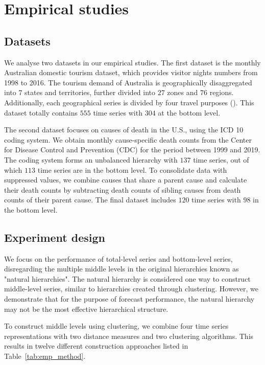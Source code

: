 \documentclass[a4paper,review,12pt,authoryear]{elsarticle}
\begin{document}
\section{Empirical studies}

\subsection{Datasets}

We analyse two datasets in our empirical studies. The first dataset is the monthly Australian domestic tourism dataset, which provides visitor nights numbers from 1998 to 2016. The tourism demand of Australia is geographically disaggregated into $7$ states and territories, further divided into $27$ zones and $76$ regions. Additionally, each geographical series is divided by four travel purposes (\citealp{wickramasuriyaOptimalForecastReconciliation2019}). This dataset totally contains $555$ time series with $304$ at the bottom level.

The second dataset focuses on causes of death in the U.S., using the ICD 10 coding system. We obtain monthly cause-specific death counts from the Center for Disease Control and Prevention (CDC) for the period between 1999 and 2019. The coding system forms an unbalanced hierarchy with $137$ time series, out of which $113$ time series are in the bottom level. To consolidate data with suppressed values, we combine causes that share a parent cause and calculate their death counts by subtracting death counts of sibling causes from death counts of their parent cause. The final dataset includes $120$ time series with $98$ in the bottom level.

\subsection{Experiment design}

We focus on the performance of total-level series and bottom-level series, disregarding the multiple middle levels in the original hierarchies known as "natural hierarchies". The natural hierarchy is considered one way to construct middle-level series, similar to hierarchies created through clustering. However, we demonstrate that for the purpose of forecast performance, the natural hierarchy may not be the most effective hierarchical structure.

To construct middle levels using clustering, we combine four time series representations with two distance measures and two clustering algorithms. This results in twelve different construction approaches listed in Table~\ref{tab:emp_method}.
\end{document}
